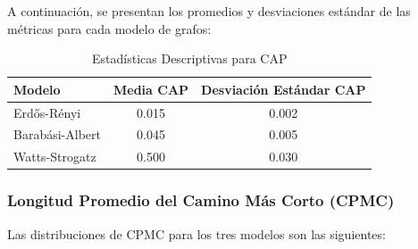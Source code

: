 \documentclass[12pt]{book}
\begin{document}
A continuación, se presentan los promedios y desviaciones estándar de las métricas para cada modelo de grafos:

\begin{table}[ht]
    \centering
    \begin{tabular}{lcc}
    \toprule
    Modelo & Media CAP & Desviación Estándar CAP \\
    \midrule
    Erdős-Rényi & 0.015 & 0.002 \\
    Barabási-Albert & 0.045 & 0.005 \\
    Watts-Strogatz & 0.500 & 0.030 \\
    \bottomrule
    \end{tabular}
    \caption{Estadísticas Descriptivas para CAP}
    \end{table}

\subsubsection{Longitud Promedio del Camino Más Corto (CPMC)}
Las distribuciones de CPMC para los tres modelos son las siguientes:
\end{document}
